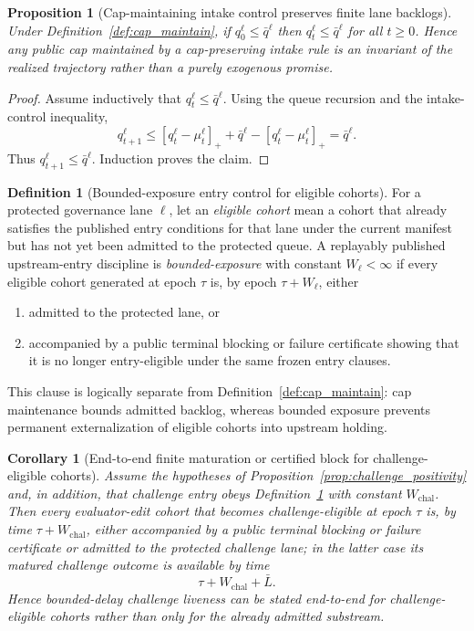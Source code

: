 \documentclass[11pt]{article}
\newtheorem{proposition}[theorem]{Proposition}
\newtheorem{corollary}[theorem]{Corollary}
\theoremstyle{definition}
\newtheorem{definition}[theorem]{Definition}
\newcommand{\1}{\mathbf{1}}
\begin{document}
\begin{proposition}[Cap-maintaining intake control preserves finite lane backlogs]\label{prop:cap_invariance}
Under Definition~\ref{def:cap_maintain}, if $q_0^{\ell}\le \bar q^{\ell}$ then $q_t^{\ell}\le \bar q^{\ell}$ for all $t\ge 0$. Hence any public cap maintained by a cap-preserving intake rule is an invariant of the realized trajectory rather than a purely exogenous promise.
\end{proposition}

\begin{proof}
Assume inductively that $q_t^{\ell}\le \bar q^{\ell}$. Using the queue recursion and the intake-control inequality,
\[
q_{t+1}^{\ell}
\le [q_t^{\ell}-\mu_t^{\ell}]_+ + \bar q^{\ell}-[q_t^{\ell}-\mu_t^{\ell}]_+
=\bar q^{\ell}.
\]
Thus $q_{t+1}^{\ell}\le \bar q^{\ell}$. Induction proves the claim.
\end{proof}

\begin{definition}[Bounded-exposure entry control for eligible cohorts]\label{def:bounded_exposure_intake}
For a protected governance lane $\ell$, let an \emph{eligible cohort} mean a cohort that already satisfies the published entry conditions for that lane under the current manifest but has not yet been admitted to the protected queue. A replayably published upstream-entry discipline is \emph{bounded-exposure} with constant $W_{\ell}<\infty$ if every eligible cohort generated at epoch $\tau$ is, by epoch $\tau+W_{\ell}$, either
\begin{enumerate}[label=(\roman*), leftmargin=2em]
  \item admitted to the protected lane, or
  \item accompanied by a public terminal blocking or failure certificate showing that it is no longer entry-eligible under the same frozen entry clauses.
\end{enumerate}
This clause is logically separate from Definition~\ref{def:cap_maintain}: cap maintenance bounds admitted backlog, whereas bounded exposure prevents permanent externalization of eligible cohorts into upstream holding.
\end{definition}

\begin{corollary}[End-to-end finite maturation or certified block for challenge-eligible cohorts]\label{cor:end_to_end_challenge}
Assume the hypotheses of Proposition~\ref{prop:challenge_positivity} and, in addition, that challenge entry obeys Definition~\ref{def:bounded_exposure_intake} with constant $W_{\mathrm{chal}}$. Then every evaluator-edit cohort that becomes challenge-eligible at epoch $\tau$ is, by time $\tau+W_{\mathrm{chal}}$, either accompanied by a public terminal blocking or failure certificate or admitted to the protected challenge lane; in the latter case its matured challenge outcome is available by time
\[
\tau + W_{\mathrm{chal}} + \bar L.
\]
Hence bounded-delay challenge liveness can be stated end-to-end for challenge-eligible cohorts rather than only for the already admitted substream.
\end{corollary}
\end{document}
